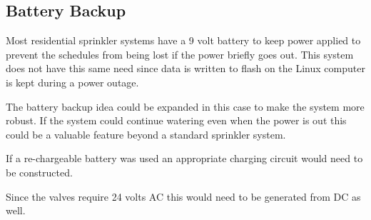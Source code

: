 \documentclass{article}
\begin{document}
\subsection{Battery Backup}

Most residential sprinkler systems have a 9 volt battery to keep power
applied to prevent the schedules from being lost if the power briefly goes out.
This system does not have this same need since data is written to flash
on the Linux computer is kept during a power outage.

The battery backup idea could be expanded in this case to make the
system more robust.
If the system could continue watering even when the power is out
this could be a valuable feature beyond a standard sprinkler system.

If a re-chargeable battery was used an appropriate charging circuit
would need to be constructed.

Since the valves require 24 volts AC this would need to be generated from
DC as well.


\pagebreak
\glsaddall
\printglossaries

\clearpage
\printbibliography[heading=bibintoc]
\end{document}

